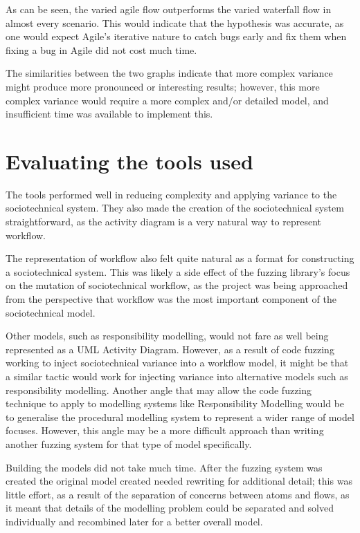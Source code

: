 As can be seen, the varied agile flow outperforms the varied waterfall flow in almost every scenario. This would indicate that the hypothesis was accurate, as one would expect Agile's iterative nature to catch bugs early and fix them when fixing a bug in Agile did not cost much time. \par

The similarities between the two graphs indicate that more complex variance might produce more pronounced or interesting results; however, this more complex variance would require a more complex and/or detailed model, and insufficient time was available to implement this. \par

 \par

\section{Evaluating the tools used}
The tools performed well in reducing complexity and applying variance to the sociotechnical system. They also made the creation of the sociotechnical system straightforward, as the activity diagram is a very natural way to represent workflow. \par

The representation of workflow also felt quite natural as a format for constructing a sociotechnical system. This was likely a side effect of the fuzzing library's focus on the mutation of sociotechnical workflow, as the project was being approached from the perspective that workflow was the most important component of the sociotechnical model. \par

Other models, such as responsibility modelling, would not fare as well being represented as a UML Activity Diagram. However, as a result of code fuzzing working to inject sociotechnical variance into a workflow model, it might be that a similar tactic would work for injecting variance into alternative models such as responsibility modelling. Another angle that may allow the code fuzzing technique to apply to modelling systems like Responsibility Modelling would be to generalise the procedural modelling system to represent a wider range of model focuses. However, this angle may be a more difficult approach than writing another fuzzing system for that type of model specifically. \par

Building the models did not take much time. After the fuzzing system was created the original model created needed rewriting for additional detail; this was little effort, as a result of the separation of concerns between atoms and flows, as it meant that details of the modelling problem could be separated and solved individually and recombined later for a better overall model. \par

